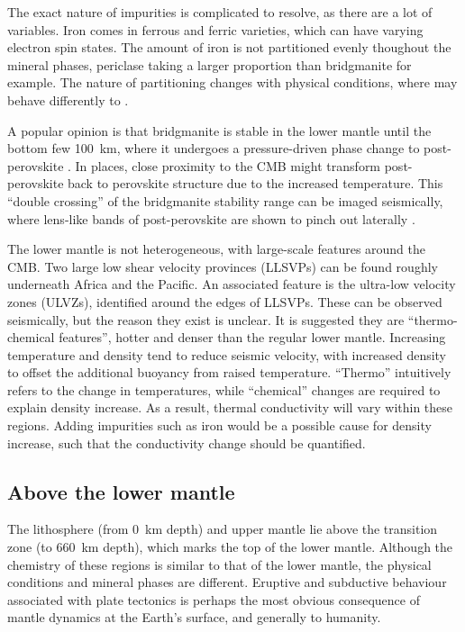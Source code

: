 The exact nature of impurities is complicated to resolve, as there are a lot of variables. Iron comes in ferrous and ferric varieties, which can have varying electron spin states. The amount of iron is not partitioned evenly thoughout the mineral phases, periclase taking a larger proportion than bridgmanite for example. The nature of partitioning changes with physical conditions, where \ppvs may behave differently to \bdg.

A popular opinion is that bridgmanite is stable in the lower mantle until the bottom few 100~km, where it undergoes a pressure-driven phase change to post-perovskite \citep{Murakami2004,Oganov2004}. In places, close proximity to the CMB might transform post-perovskite back to perovskite structure due to the increased temperature. This ``double crossing'' of the bridgmanite stability range can be imaged seismically, where lens-like bands of post-perovskite are shown to pinch out laterally \citep{Lay2006}.

The lower mantle is not heterogeneous, with large-scale features around the CMB. Two large low shear velocity provinces (LLSVPs) can be found roughly underneath Africa and the Pacific. An associated feature is the ultra-low velocity zones (ULVZs), identified around the edges of LLSVPs. These can be observed seismically, but the reason they exist is unclear. It is suggested they are ``thermo-chemical features'', hotter and denser than the regular lower mantle. Increasing temperature and density tend to reduce seismic velocity, with increased density to offset the additional buoyancy from raised temperature. ``Thermo'' intuitively refers to the change in temperatures, while ``chemical'' changes are required to explain density increase. As a result, thermal conductivity will vary within these regions. Adding impurities such as iron would be a possible cause for density increase, such that the conductivity change should be quantified.



\subsection{Above the lower mantle}

The lithosphere (from 0~km depth) and upper mantle lie above the transition zone (to 660~km depth), which marks the top of the lower mantle. Although the chemistry of these regions is similar to that of the lower mantle, the physical conditions and mineral phases are different. Eruptive and subductive behaviour associated with plate tectonics is perhaps the most obvious consequence of mantle dynamics at the Earth's surface, and generally to humanity.

